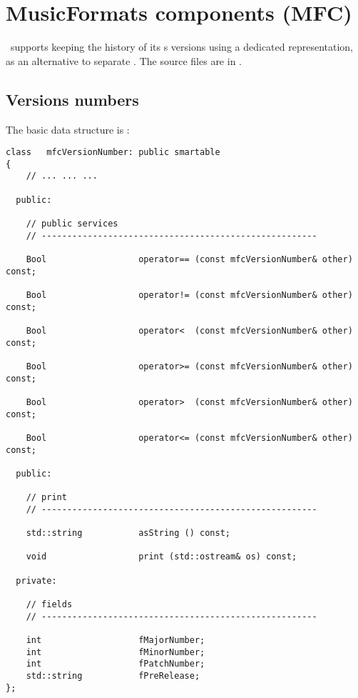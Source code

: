 
\chapter{MusicFormats components (MFC)}\label{MusicFormats components (MFC)}

\mf\ supports keeping the history of its \component s versions using a dedicated representation, as an alternative to separate . The source files are in \mfc.


\section{Versions numbers}\label{Versions numbers}

The basic data structure is :
\begin{lstlisting}[language=CPlusPlus]
class   mfcVersionNumber: public smartable
{
	// ... ... ...

  public:

    // public services
    // ------------------------------------------------------

    Bool                  operator== (const mfcVersionNumber& other) const;

    Bool                  operator!= (const mfcVersionNumber& other) const;

    Bool                  operator<  (const mfcVersionNumber& other) const;

    Bool                  operator>= (const mfcVersionNumber& other) const;

    Bool                  operator>  (const mfcVersionNumber& other) const;

    Bool                  operator<= (const mfcVersionNumber& other) const;

  public:

    // print
    // ------------------------------------------------------

    std::string           asString () const;

    void                  print (std::ostream& os) const;

  private:

    // fields
    // ------------------------------------------------------

    int                   fMajorNumber;
    int                   fMinorNumber;
    int                   fPatchNumber;
    std::string           fPreRelease;
};
\end{lstlisting}


